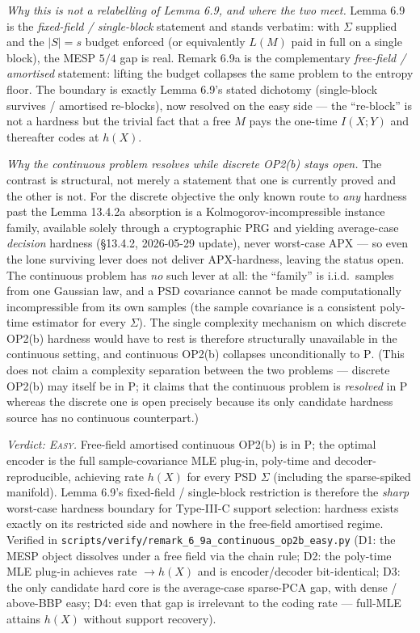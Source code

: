 \documentclass[
]{article}
\begin{document}
\emph{Why this is not a relabelling of Lemma 6.9, and where the two meet.}
Lemma 6.9 is the \emph{fixed-field / single-block} statement and stands
verbatim: with $\Sigma$ supplied and the $|S|=s$ budget enforced (or
equivalently $L(M)$ paid in full on a single block), the MESP $5/4$ gap is
real. Remark 6.9a is the complementary \emph{free-field / amortised}
statement: lifting the budget collapses the same problem to the entropy
floor. The boundary is exactly Lemma 6.9's stated dichotomy (single-block
survives / amortised re-blocks), now resolved on the easy side --- the
``re-block'' is not a hardness but the trivial fact that a free $M$ pays the
one-time $I(X;Y)$ and thereafter codes at $h(X)$.

\emph{Why the continuous problem resolves while discrete OP2(b) stays open.}
The contrast is structural, not merely a statement that one is currently
proved and the other is not. For the discrete objective the only known route
to \emph{any} hardness past the Lemma 13.4.2a absorption is a
Kolmogorov-incompressible instance family, available solely through a
cryptographic PRG and yielding average-case \emph{decision} hardness
(\S 13.4.2, 2026-05-29 update), never worst-case APX --- so even the lone
surviving lever does not deliver APX-hardness, leaving the status open. The
continuous problem has \emph{no} such lever at all: the ``family'' is i.i.d.\
samples from one Gaussian law, and a PSD covariance cannot be made
computationally incompressible from its own samples (the sample covariance is
a consistent poly-time estimator for every $\Sigma$). The single complexity
mechanism on which discrete OP2(b) hardness would have to rest is therefore
structurally unavailable in the continuous setting, and continuous OP2(b)
collapses unconditionally to $\mathrm P$. (This does not claim a complexity
separation between the two problems --- discrete OP2(b) may itself be in
$\mathrm P$; it claims that the continuous problem is \emph{resolved} in
$\mathrm P$ whereas the discrete one is open precisely because its only
candidate hardness source has no continuous counterpart.)

\emph{Verdict: \textsc{Easy}.} Free-field amortised continuous OP2(b) is in
$\mathrm P$; the optimal encoder is the full sample-covariance MLE plug-in,
poly-time and decoder-reproducible, achieving rate $h(X)$ for every PSD
$\Sigma$ (including the sparse-spiked manifold). Lemma 6.9's fixed-field /
single-block restriction is therefore the \emph{sharp} worst-case hardness
boundary for Type-III-C support selection: hardness exists exactly on its
restricted side and nowhere in the free-field amortised regime. Verified in
\texttt{scripts/verify/remark\_6\_9a\_continuous\_op2b\_easy.py} (D1: the MESP
object dissolves under a free field via the chain rule; D2: the poly-time MLE
plug-in achieves rate $\to h(X)$ and is encoder/decoder bit-identical; D3: the
only candidate hard core is the average-case sparse-PCA gap, with dense /
above-BBP easy; D4: even that gap is irrelevant to the coding rate ---
full-MLE attains $h(X)$ without support recovery).
\end{document}
